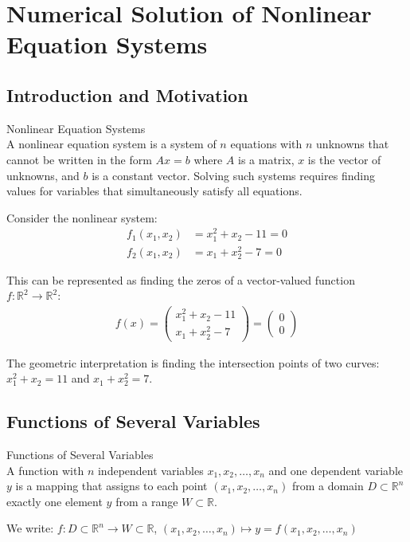\raggedcolumns

\section{Numerical Solution of Nonlinear Equation Systems}

\subsection{Introduction and Motivation}

\begin{definition}{Nonlinear Equation Systems}\\
A nonlinear equation system is a system of $n$ equations with $n$ unknowns that cannot be written in the form $Ax = b$ where $A$ is a matrix, $x$ is the vector of unknowns, and $b$ is a constant vector. Solving such systems requires finding values for variables that simultaneously satisfy all equations.
\end{definition}

\begin{example}
Consider the nonlinear system:
\begin{align*}
f_1(x_1, x_2) &= x_1^2 + x_2 - 11 = 0\\
f_2(x_1, x_2) &= x_1 + x_2^2 - 7 = 0
\end{align*}

This can be represented as finding the zeros of a vector-valued function $f: \mathbb{R}^2 \rightarrow \mathbb{R}^2$:
\begin{align*}
f(x) = \begin{pmatrix} x_1^2 + x_2 - 11 \\ x_1 + x_2^2 - 7 \end{pmatrix} = \begin{pmatrix} 0 \\ 0 \end{pmatrix}
\end{align*}

The geometric interpretation is finding the intersection points of two curves: $x_1^2 + x_2 = 11$ and $x_1 + x_2^2 = 7$.
\end{example}

\subsection{Functions of Several Variables}

\begin{definition}{Functions of Several Variables}\\
A function with $n$ independent variables $x_1, x_2, \ldots, x_n$ and one dependent variable $y$ is a mapping that assigns to each point $(x_1, x_2, \ldots, x_n)$ from a domain $D \subset \mathbb{R}^n$ exactly one element $y$ from a range $W \subset \mathbb{R}$.

We write: $f: D \subset \mathbb{R}^n \rightarrow W \subset \mathbb{R}$, $(x_1, x_2, \ldots, x_n) \mapsto y = f(x_1, x_2, \ldots, x_n)$
\end{definition}

